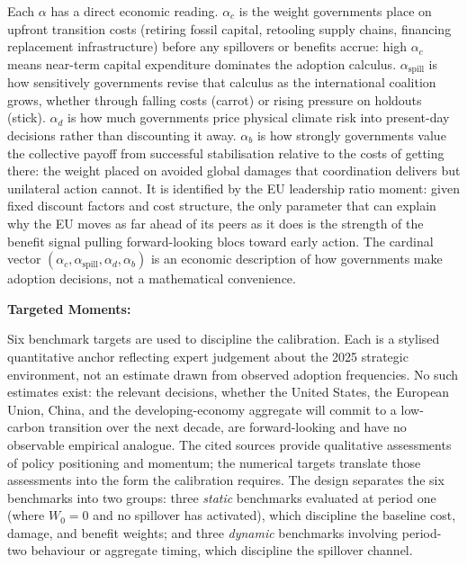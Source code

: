 \documentclass[10pt,a4paper]{article}
\newcommand{\bpar}[1]{%
  \par\addvspace{\medskipamount}%
  \needspace{4\baselineskip}%
  \noindent\textbf{#1}\par\nopagebreak[4]%
}
\begin{document}
Each $\alpha$ has a direct economic reading. $\alpha_c$ is the weight governments place on upfront transition costs (retiring fossil capital, retooling supply chains, financing replacement infrastructure) before any spillovers or benefits accrue: high $\alpha_c$ means near-term capital expenditure dominates the adoption calculus. $\alpha_{\text{spill}}$ is how sensitively governments revise that calculus as the international coalition grows, whether through falling costs (carrot) or rising pressure on holdouts (stick). $\alpha_d$ is how much governments price physical climate risk into present-day decisions rather than discounting it away. $\alpha_b$ is how strongly governments value the collective payoff from successful stabilisation relative to the costs of getting there: the weight placed on avoided global damages that coordination delivers but unilateral action cannot. It is identified by the EU leadership ratio moment: given fixed discount factors and cost structure, the only parameter that can explain why the EU moves as far ahead of its peers as it does is the strength of the benefit signal pulling forward-looking blocs toward early action. The cardinal vector $(\alpha_c, \alpha_{\text{spill}}, \alpha_d, \alpha_b)$ is an economic description of how governments make adoption decisions, not a mathematical convenience.

\bpar{Targeted Moments:}

Six benchmark targets are used to discipline the calibration. Each is a stylised quantitative
anchor reflecting expert judgement about the 2025 strategic environment, not an estimate drawn
from observed adoption frequencies. No such estimates exist: the relevant decisions, whether
the United States, the European Union, China, and the developing-economy aggregate will commit
to a low-carbon transition over the next decade, are forward-looking and have
no observable empirical analogue. The cited sources provide qualitative assessments of policy
positioning and momentum; the numerical targets translate those assessments into the form the
calibration requires. The design separates the six benchmarks into two groups: three
\textit{static} benchmarks evaluated at period one (where $W_0 = 0$ and no spillover has
activated), which discipline the baseline cost, damage, and benefit weights; and three
\textit{dynamic} benchmarks involving period-two behaviour or aggregate timing, which discipline
the spillover channel.
\end{document}
